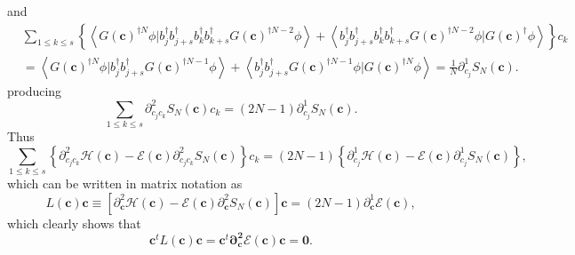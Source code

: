 \documentclass[aps,preprint]{revtex4}%
\begin{document}
and
\begin{align}
&  \sum_{1\leq k\leq s}\left\{  \left\langle G\left(  \mathbf{c}\right)
^{\dagger N}\phi|b_{j}^{\dagger}b_{j+s}^{\dagger}b_{k}^{\dagger}%
b_{k+s}^{\dagger}G\left(  \mathbf{c}\right)  ^{\dagger N-2}\phi\right\rangle
+\left\langle b_{j}^{\dagger}b_{j+s}^{\dagger}b_{k}^{\dagger}b_{k+s}^{\dagger
}G\left(  \mathbf{c}\right)  ^{\dagger N-2}\phi|G\left(  \mathbf{c}\right)
^{\dagger}\phi\right\rangle \right\}  c_{k}\nonumber\\
&  =\left\langle G\left(  \mathbf{c}\right)  ^{\dagger N}\phi|b_{j}^{\dagger
}b_{j+s}^{\dagger}G\left(  \mathbf{c}\right)  ^{\dagger N-1}\phi\right\rangle
+\left\langle b_{j}^{\dagger}b_{j+s}^{\dagger}G\left(  \mathbf{c}\right)
^{\dagger N-1}\phi|G\left(  \mathbf{c}\right)  ^{\dagger N}\phi\right\rangle
=\frac{1}{N}\partial_{c_{j}}^{1}S_{N}\left(  \mathbf{c}\right)  .
\end{align}
producing
\begin{equation}
\sum_{1\leq k\leq s}\partial_{c_{j}c_{k}}^{2}S_{N}\left(  \mathbf{c}\right)
c_{k}=\left(  2N-1\right)  \partial_{c_{j}}^{1}S_{N}\left(  \mathbf{c}\right)
.
\end{equation}
Thus
\begin{equation}
\sum_{1\leq k\leq s}\left\{  \partial_{c_{j}c_{k}}^{2}\mathcal{H}\left(
\mathbf{c}\right)  -\mathcal{E}\left(  \mathbf{c}\right)  \partial_{c_{j}%
c_{k}}^{2}S_{N}\left(  \mathbf{c}\right)  \right\}  c_{k}=\left(  2N-1\right)
\left\{  \partial_{c_{j}}^{1}\mathcal{H}\left(  \mathbf{c}\right)
-\mathcal{E}\left(  \mathbf{c}\right)  \partial_{c_{j}}^{1}S_{N}\left(
\mathbf{c}\right)  \right\}  ,
\end{equation}
which can be written in matrix notation as
\begin{equation}
L\left(  \mathbf{c}\right)  \mathbf{c}\equiv\left[  \partial_{\mathbf{c}}%
^{2}\mathcal{H}\left(  \mathbf{c}\right)  -\mathcal{E}\left(  \mathbf{c}%
\right)  \partial_{\mathbf{c}}^{2}S_{N}\left(  \mathbf{c}\right)  \right]
\mathbf{c=}\left(  2N-1\right)  \partial_{\mathbf{c}}^{1}\mathcal{E}\left(
\mathbf{c}\right)  , \label{gradrel}%
\end{equation}
which clearly shows that
\begin{equation}
\mathbf{c}^{t}L\left(  \mathbf{c}\right)  \mathbf{c=\mathbf{c}}^{t}%
\mathbf{\partial_{\mathbf{c}}^{2}\mathcal{E}\left(  \mathbf{c}\right)
\mathbf{c}}=\mathbf{0.} \label{cd2c}%
\end{equation}
\end{document}
